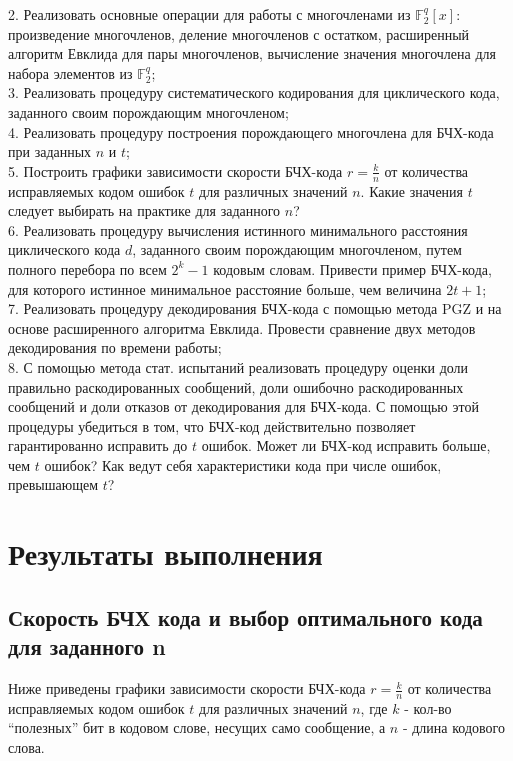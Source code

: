 \documentclass[12pt]{article}
\newcommand{\Fq}{\mathbb{F}_2^q}
\begin{document}
        2. Реализовать основные операции для работы с многочленами из $\Fq[x]$: произведение многочленов, 
        деление многочленов с остатком, расширенный алгоритм Евклида для пары многочленов, вычисление 
        значения многочлена для набора элементов из $\Fq$; \\

        3. Реализовать процедуру систематического кодирования для циклического кода, заданного своим 
        порождающим многочленом; \\

        4. Реализовать процедуру построения порождающего многочлена для БЧХ-кода при заданных $n$ и 
        $t$; \\

        5. Построить графики зависимости скорости БЧХ-кода $r=\frac{k}{n}$ от количества исправляемых 
        кодом ошибок $t$ для различных значений $n$. Какие значения $t$ следует выбирать на практике
        для заданного $n$? \\

        6. Реализовать процедуру вычисления истинного минимального расстояния циклического кода $d$, заданного
        своим порождающим многочленом, путем полного перебора по всем $2^k - 1$ кодовым словам. Привести
        пример БЧХ-кода, для которого истинное минимальное расстояние больше, чем величина $2t + 1$; \\

        7. Реализовать процедуру декодирования БЧХ-кода с помощью метода PGZ и на основе расширенного 
        алгоритма Евклида. Провести сравнение двух методов декодирования по времени работы; \\

        8. С помощью метода стат. испытаний реализовать процедуру оценки доли правильно раскодированных 
        сообщений, доли ошибочно раскодированных сообщений и доли отказов от декодирования для БЧХ-кода. С
        помощью этой процедуры убедиться в том, что БЧХ-код действительно позволяет гарантированно 
        исправить до $t$ ошибок. Может ли БЧХ-код исправить больше, чем $t$ ошибок? Как ведут себя характеристики
        кода при числе ошибок, превышающем $t$? \\

    \section{Результаты выполнения}
        \subsection{Скорость БЧХ кода и выбор оптимального кода для заданного n}
            Ниже приведены графики зависимости скорости БЧХ-кода $r=\frac{k}{n}$ от количества исправляемых 
            кодом ошибок $t$ для различных значений $n$, где $k$ - кол-во ``полезных'' бит в кодовом слове, 
            несущих само сообщение, а $n$ - длина кодового слова. \\
\end{document}
